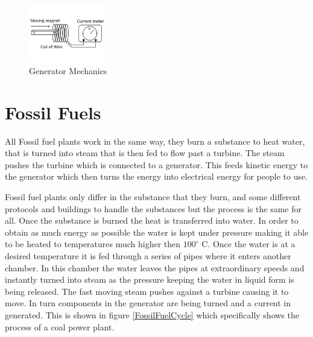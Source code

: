 \documentclass[msc,oneside]{ubcthesis}%
\begin{document}
  \begin{figure}[hbt]{\label{Induction} }
  \begin{center}
    \includegraphics[width=0.3\textwidth]{Induction}
    \caption[Generator Mechanics]{Generator Mechanics}  
  \end{center}
\end{figure}

\newpage
  \section{Fossil Fuels}

  All Fossil fuel plants work in the same way, they burn a substance to heat water, that is turned into 
  steam that is then fed to flow past a turbine. The steam pushes the turbine which is connected to a 
  generator. This feeds kinetic energy to the generator which then turns the energy into electrical energy 
  for people to use.

Fossil fuel plants only differ in the substance that they burn, and some different protocols and buildings 
to handle the substances but the process is the same for all. Once the substance is burned the heat is 
transferred into water. In order to obtain as much energy as possible the water is kept under pressure 
making it able to be heated to temperatures much higher then $100^\circ$ C. Once the water is at a 
desired temperature it is fed through a series of pipes where it enters another chamber. In this chamber 
the water leaves the pipes at extraordinary speeds and instantly turned into steam as the pressure keeping 
the water in liquid form is being released. The fast moving steam pushes against a turbine causing it to 
move. In turn components in the generator are being turned and a current in generated. This is shown in figure \ref{FossilFuelCycle} which specifically shows the process of a coal power plant. 
\end{document}
